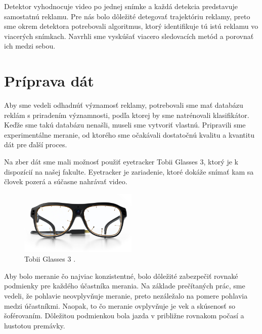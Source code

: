 
Detektor vyhodnocuje video po jednej snímke a každá detekcia predstavuje samostatnú reklamu. Pre nás bolo dôležité detegovať trajektóriu reklamy, preto sme okrem detektora potrebovali algoritmus, ktorý identifikuje tú istú reklamu vo viacerých snímkach. Navrhli sme vyskúšať viacero sledovacích metód a porovnať ich medzi sebou.

\section{Príprava dát}

Aby sme vedeli odhadnúť významosť reklamy, potrebovali sme mať databázu reklám s priradením významnosti, podľa ktorej by sme natrénovali klasifikátor. Keďže sme takú databázu nenašli, museli sme vytvoriť vlastnú. Pripravili sme experimentálne meranie, od ktorého sme očakávali dostatočnú kvalitu a kvantitu dát pre ďalší proces.

Na zber dát sme mali možnosť použiť eyetracker Tobii Glasses 3, ktorý je k dispozícií na našej fakulte. Eyetracker je zariadenie, ktoré dokáže snímať kam sa človek pozerá a súčasne nahrávať video.

\begin{figure}[ht]
    \centering
    \includegraphics[width=0.5\textwidth]{images/02/glasses.jpg}
    \caption{Tobii Glasses 3 \cite{tobii}.}
    \label{img:tobii}
\end{figure}


Aby bolo meranie čo najviac konzistentné, bolo dôležité zabezpečiť rovnaké podmienky pre každého účastníka merania. Na základe prečítaných prác, %
sme vedeli, že pohlavie neovplyvňuje meranie, preto nezáležalo na pomere pohlavia medzi účastníkmi. Naopak, to čo meranie ovplyvňuje je vek a skúsenosť so šoférovaním. Dôležitou podmienkou bola jazda v približne rovnakom počasí a hustotou premávky. 

